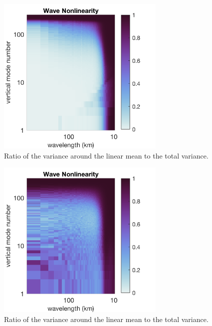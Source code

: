 \documentclass[10pt]{article}
\begin{document}
\begin{figure}[t]
  \centerline{\includegraphics[width=19pc,angle=0]{figures/WaveNonlinearity}}
  \caption{Ratio of the variance around the linear mean to the total variance.}
  \label{WaveNonlinearity}
\end{figure}

\begin{figure}[t]
  \centerline{\includegraphics[width=19pc,angle=0]{figures/VortexNonlinearity}}
  \caption{Ratio of the variance around the linear mean to the total variance.}
  \label{VortexNonlinearity}
\end{figure}
\end{document}
